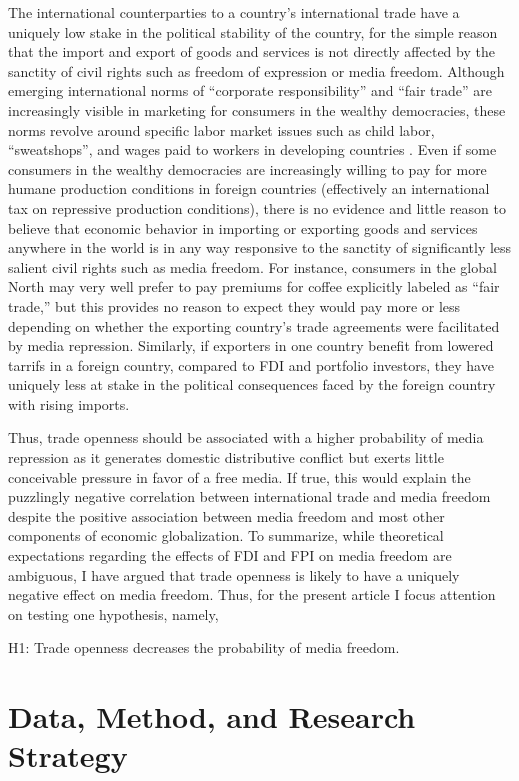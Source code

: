 \documentclass[12pt,a4paper]{article}\usepackage[]{graphicx}\usepackage[]{color}
\begin{document}
The international counterparties to a country's international trade have a uniquely low stake in the political stability of the country, for the simple reason that the import and export of goods and services is not directly affected by the sanctity of civil rights such as freedom of expression or media freedom. Although emerging international norms of “corporate responsibility” and “fair trade” are increasingly visible in marketing for consumers in the wealthy democracies, these norms revolve around specific labor market issues such as child labor, ``sweatshops'', and wages paid to workers in developing countries \parencite{Moore:2004gy}. Even if some consumers in the wealthy democracies are increasingly willing to pay for more humane production conditions in foreign countries (effectively an international tax on repressive production conditions), there is no evidence and little reason to believe that economic behavior in importing or exporting goods and services anywhere in the world is in any way responsive to the sanctity of significantly less salient civil rights such as media freedom. For instance, consumers in the global North may very well prefer to pay premiums for coffee explicitly labeled as “fair trade,” but this provides no reason to expect they would pay more or less depending on whether the exporting country's trade agreements were facilitated by media repression. Similarly, if exporters in one country benefit from lowered tarrifs in a foreign country, compared to FDI and portfolio investors, they have uniquely less at stake in the political consequences faced by the foreign country with rising imports.

Thus, trade openness should be associated with a higher probability of media repression as it generates domestic distributive conflict but exerts little conceivable pressure in favor of a free media. If true, this would explain the puzzlingly negative correlation between international trade and media freedom despite the positive association between media freedom and most other components of economic globalization.
To summarize, while theoretical expectations regarding the effects of FDI and FPI on media freedom are ambiguous, I have argued that trade openness is likely to have a uniquely negative effect on media freedom. Thus, for the present article I focus attention on testing one hypothesis, namely,

H1: Trade openness decreases the probability of media freedom.


\section{Data, Method, and Research Strategy}
\end{document}
